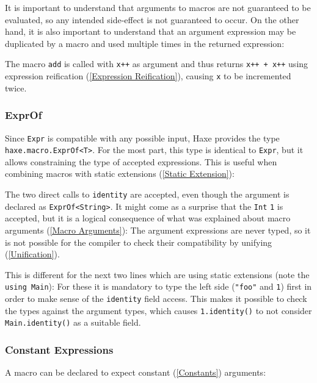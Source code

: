 \documentclass{article}
\newcommand{\type}[1]{\texttt{#1}}
\newcommand{\expr}[1]{\texttt{#1}}
\newcommand{\tref}[2]{#1 (\ref{#2})}
\newcommand{\haxe}[2][]{%
}
\begin{document}
It is important to understand that arguments to macros are not guaranteed to be evaluated, so any intended side-effect is not guaranteed to occur. On the other hand, it is also important to understand that an argument expression may be duplicated by a macro and used multiple times in the returned expression:

\haxe{assets/MacroArguments.hx}

The macro \expr{add} is called with \expr{x++} as argument and thus returns \expr{x++ + x++} using \tref{expression reification}{Expression Reification}, causing \expr{x} to be incremented twice.

\subsubsection{ExprOf}

Since \type{Expr} is compatible with any possible input, Haxe provides the type \type{haxe.macro.ExprOf<T>}. For the most part, this type is identical to \type{Expr}, but it allows constraining the type of accepted expressions. This is useful when combining macros with \tref{static extensions}{Static Extension}:

\haxe{assets/ExprOf.hx}

The two direct calls to \expr{identity} are accepted, even though the argument is declared as \expr{ExprOf<String>}. It might come as a surprise that the \type{Int} \expr{1} is accepted, but it is a logical consequence of what was explained about \tref{macro arguments}{Macro Arguments}: The argument expressions are never typed, so it is not possible for the compiler to check their compatibility by \tref{unifying}{Unification}.

This is different for the next two lines which are using static extensions (note the \expr{using Main}): For these it is mandatory to type the left side (\expr{"foo"} and \expr{1}) first in order to make sense of the \expr{identity} field access. This makes it possible to check the types against the argument types, which causes \expr{1.identity()} to not consider \expr{Main.identity()} as a suitable field.

\subsubsection{Constant Expressions}

A macro can be declared to expect \tref{constant}{Constants} arguments:

\haxe{assets/MacroArgumentsConst.hx}
\end{document}
